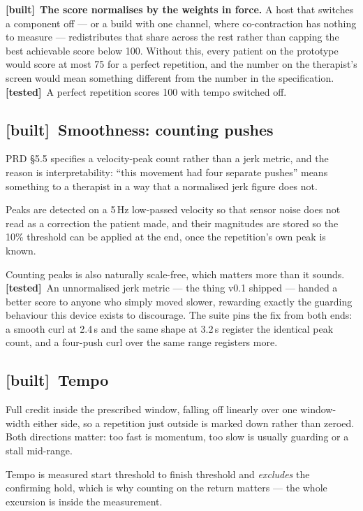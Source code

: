 \documentclass[11pt]{article}
\newcommand{\built}{{\sffamily\scriptsize\color{good}\textbf{[built]}}\ }
\newcommand{\tested}{{\sffamily\scriptsize\color{annot}\textbf{[tested]}}\ }
\begin{document}
\begin{callout}
\built \textbf{The score normalises by the weights in force.} A host that
switches a component off --- or a build with one channel, where
co-contraction has nothing to measure --- redistributes that share across the
rest rather than capping the best achievable score below 100. Without this,
every patient on the prototype would score at most 75 for a perfect
repetition, and the number on the therapist's screen would mean something
different from the number in the specification. \tested A perfect repetition
scores 100 with tempo switched off.
\end{callout}

\subsection{\built Smoothness: counting pushes}

PRD \S5.5 specifies a velocity-peak count rather than a jerk metric, and the
reason is interpretability: ``this movement had four separate pushes'' means
something to a therapist in a way that a normalised jerk figure does not.

Peaks are detected on a 5\,Hz low-passed velocity so that sensor noise does
not read as a correction the patient made, and their magnitudes are stored so
the 10\% threshold can be applied at the end, once the repetition's own peak
is known.

\medskip
\noindent
Counting peaks is also naturally scale-free, which matters more than it
sounds. \tested An unnormalised jerk metric --- the thing v0.1 shipped ---
handed a better score to anyone who simply moved slower, rewarding exactly the
guarding behaviour this device exists to discourage. The suite pins the fix
from both ends: a smooth curl at 2.4\,s and the same shape at 3.2\,s register
the identical peak count, and a four-push curl over the same range registers
more.

\subsection{\built Tempo}

Full credit inside the prescribed window, falling off linearly over one
window-width either side, so a repetition just outside is marked down rather
than zeroed. Both directions matter: too fast is momentum, too slow is usually
guarding or a stall mid-range.

\medskip
\noindent
Tempo is measured start threshold to finish threshold and \emph{excludes} the
confirming hold, which is why counting on the return matters --- the whole
excursion is inside the measurement.
\end{document}
